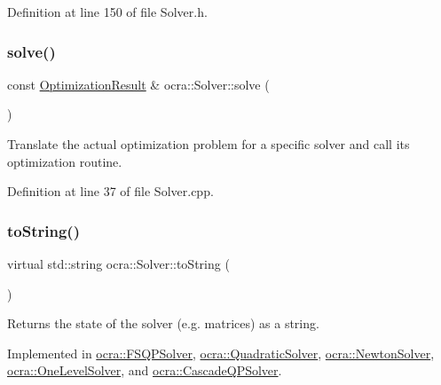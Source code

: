 Definition at line 150 of file Solver.\+h.

\hypertarget{classocra_1_1Solver_a86151fea09399da16d6ce47abb1ba904}{}\label{classocra_1_1Solver_a86151fea09399da16d6ce47abb1ba904} 
\subsubsection{\texorpdfstring{solve()}{solve()}}
{\footnotesize\ttfamily const \hyperlink{structocra_1_1OptimizationResult}{Optimization\+Result} \& ocra\+::\+Solver\+::solve (\begin{DoxyParamCaption}{ }\end{DoxyParamCaption})}

Translate the actual optimization problem for a specific solver and call its optimization routine. 

Definition at line 37 of file Solver.\+cpp.

\hypertarget{classocra_1_1Solver_ab3783d1c208500bfb1daa3e1abf34146}{}\label{classocra_1_1Solver_ab3783d1c208500bfb1daa3e1abf34146} 
\subsubsection{\texorpdfstring{to\+String()}{toString()}}
{\footnotesize\ttfamily virtual std\+::string ocra\+::\+Solver\+::to\+String (\begin{DoxyParamCaption}{ }\end{DoxyParamCaption})\hspace{0.3cm}{\ttfamily [pure virtual]}}

Returns the state of the solver (e.\+g. matrices) as a string. 

Implemented in \hyperlink{classocra_1_1FSQPSolver_a3edc67c5c989d020ac8a77bf08946d14}{ocra\+::\+F\+S\+Q\+P\+Solver}, \hyperlink{classocra_1_1QuadraticSolver_a1f4efd162b95e7688d0720805fb94445}{ocra\+::\+Quadratic\+Solver}, \hyperlink{classocra_1_1NewtonSolver_a3d498cc7771cf3cf733552a35fd77006}{ocra\+::\+Newton\+Solver}, \hyperlink{classocra_1_1OneLevelSolver_a4d96beb846ca420bd1efcc96229f9d52}{ocra\+::\+One\+Level\+Solver}, and \hyperlink{classocra_1_1CascadeQPSolver_a411f14ee5770be6a3f04d665ac844e6c}{ocra\+::\+Cascade\+Q\+P\+Solver}.



